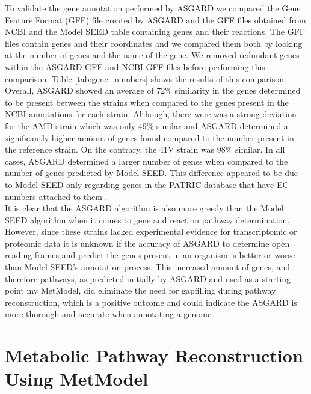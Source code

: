 \indent To validate the gene annotation performed by ASGARD we compared the Gene Feature Format (GFF) file created by ASGARD and the GFF files obtained from NCBI and the Model SEED table containing genes and their reactions. The GFF files contain genes and their coordinates and we compared them both by looking at the number of genes and the name of the gene. We removed redundant genes within the ASGARD GFF and NCBI GFF files before performing this comparison. Table \ref{tab:gene_numbers} shows the results of this comparison. Overall, ASGARD showed an average of 72\% similarity in the genes determined to be present between the strains when compared to the genes present in the NCBI annotations for each strain. Although, there were was a strong deviation for the AMD strain which was only 49\% similar and ASGARD determined a significantly higher amount of genes found compared to the number present in the reference strain. On the contrary, the 41V strain was 98\% similar. In all cases, ASGARD determined a larger number of genes when compared to the number of genes predicted by Model SEED. This difference appeared to be due to Model SEED only regarding genes in the PATRIC database that have EC numbers attached to them \citep{devoid_automated_2013}. \\
\indent It is clear that the ASGARD algorithm is also more greedy than the Model SEED algorithm when it comes to gene and reaction pathway determination. However, since these strains lacked experimental evidence for transcriptomic or proteomic data it is unknown if the accuracy of ASGARD to determine open reading frames and predict the genes present in an organism is better or worse than Model SEED's annotation process.  This increased amount of genes, and therefore pathways, as predicted initially by ASGARD and used as a starting point my MetModel, did eliminate the need for gapfilling during pathway reconstruction, which is a positive outcome and could indicate the ASGARD is more thorough and accurate when annotating a genome. \clearpage

\section{Metabolic Pathway Reconstruction Using MetModel}

